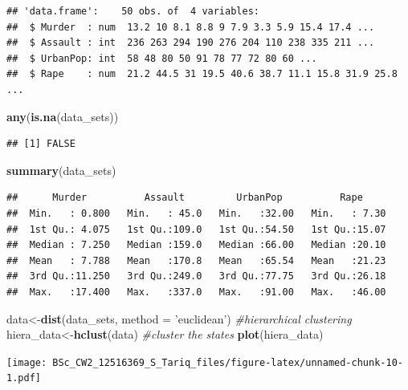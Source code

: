 \documentclass[]{article}
\newenvironment{Shaded}{\begin{snugshade}}{\end{snugshade}}
\newcommand{\CommentTok}[1]{\textcolor[rgb]{0.56,0.35,0.01}{\textit{#1}}}
\newcommand{\DataTypeTok}[1]{\textcolor[rgb]{0.13,0.29,0.53}{#1}}
\newcommand{\KeywordTok}[1]{\textcolor[rgb]{0.13,0.29,0.53}{\textbf{#1}}}
\newcommand{\NormalTok}[1]{#1}
\newcommand{\StringTok}[1]{\textcolor[rgb]{0.31,0.60,0.02}{#1}}
\begin{document}
\begin{verbatim}
## 'data.frame':    50 obs. of  4 variables:
##  $ Murder  : num  13.2 10 8.1 8.8 9 7.9 3.3 5.9 15.4 17.4 ...
##  $ Assault : int  236 263 294 190 276 204 110 238 335 211 ...
##  $ UrbanPop: int  58 48 80 50 91 78 77 72 80 60 ...
##  $ Rape    : num  21.2 44.5 31 19.5 40.6 38.7 11.1 15.8 31.9 25.8 ...
\end{verbatim}

\begin{Shaded}
\begin{Highlighting}[]
\KeywordTok{any}\NormalTok{(}\KeywordTok{is.na}\NormalTok{(data_sets))}
\end{Highlighting}
\end{Shaded}

\begin{verbatim}
## [1] FALSE
\end{verbatim}

\begin{Shaded}
\begin{Highlighting}[]
\KeywordTok{summary}\NormalTok{(data_sets)}
\end{Highlighting}
\end{Shaded}

\begin{verbatim}
##      Murder          Assault         UrbanPop          Rape      
##  Min.   : 0.800   Min.   : 45.0   Min.   :32.00   Min.   : 7.30  
##  1st Qu.: 4.075   1st Qu.:109.0   1st Qu.:54.50   1st Qu.:15.07  
##  Median : 7.250   Median :159.0   Median :66.00   Median :20.10  
##  Mean   : 7.788   Mean   :170.8   Mean   :65.54   Mean   :21.23  
##  3rd Qu.:11.250   3rd Qu.:249.0   3rd Qu.:77.75   3rd Qu.:26.18  
##  Max.   :17.400   Max.   :337.0   Max.   :91.00   Max.   :46.00
\end{verbatim}

\begin{Shaded}
\begin{Highlighting}[]
\NormalTok{data<-}\KeywordTok{dist}\NormalTok{(data_sets, }\DataTypeTok{method =} \StringTok{'euclidean'}\NormalTok{)}
\CommentTok{#hierarchical clustering}
\NormalTok{hiera_data<-}\KeywordTok{hclust}\NormalTok{(data)}
\CommentTok{#cluster the states}
\KeywordTok{plot}\NormalTok{(hiera_data)}
\end{Highlighting}
\end{Shaded}

\texttt{[image: BSc\_CW2\_12516369\_S\_Tariq\_files/figure-latex/unnamed-chunk-10-1.pdf]}
\end{document}
